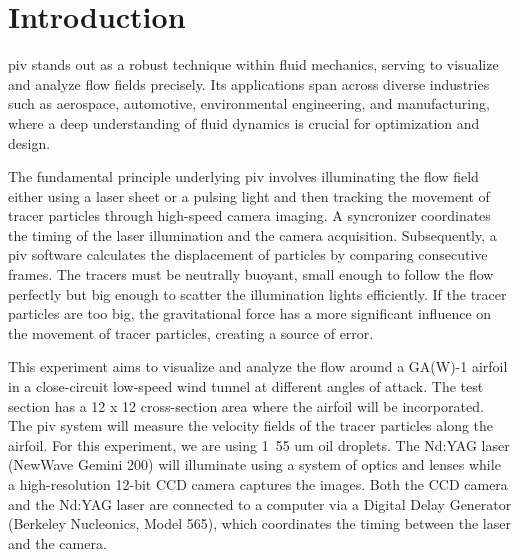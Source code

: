 \chapter{Introduction}
\label{cp:introduction}
\acrshort{piv} stands out as a robust technique within fluid mechanics, serving to visualize and analyze flow fields precisely. Its applications span across diverse industries such as aerospace, automotive, environmental engineering, and manufacturing, where a deep understanding of fluid dynamics is crucial for optimization and design.

The fundamental principle underlying \acrshort{piv} involves illuminating the flow field either using a laser sheet or a pulsing light and then tracking the movement of tracer particles through high-speed camera imaging. A syncronizer coordinates the timing of the laser illumination and the camera acquisition. Subsequently, a \acrshort{piv} software calculates the displacement of particles by comparing consecutive frames. The tracers must be neutrally buoyant, small enough to follow the flow perfectly but big enough to scatter the illumination lights efficiently. If the tracer particles are too big, the gravitational force has a more significant influence on the movement of tracer particles, creating a source of error. 

This experiment aims to visualize and analyze the flow around a GA(W)-1 airfoil in a close-circuit low-speed wind tunnel at different angles of attack. The test section has a 12 x 12 cross-section area where the airfoil will be incorporated. The \acrshort{piv} system will measure the velocity fields of the tracer particles along the airfoil. For this experiment, we are using 1~55 um oil droplets. The Nd:YAG laser (NewWave Gemini 200) will illuminate using a system of optics and lenses while a high-resolution 12-bit CCD camera captures the images. Both the  CCD camera and the Nd:YAG laser are connected to a computer via a Digital Delay Generator (Berkeley Nucleonics, Model 565), which coordinates the timing between the laser and the camera. 


